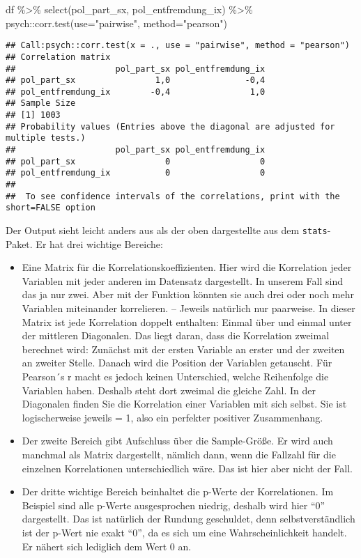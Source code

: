 \documentclass[
]{book}
\newenvironment{Shaded}{\begin{snugshade}}{\end{snugshade}}
\newcommand{\AttributeTok}[1]{\textcolor[rgb]{0.77,0.63,0.00}{#1}}
\newcommand{\FunctionTok}[1]{\textcolor[rgb]{0.00,0.00,0.00}{#1}}
\newcommand{\NormalTok}[1]{#1}
\newcommand{\SpecialCharTok}[1]{\textcolor[rgb]{0.00,0.00,0.00}{#1}}
\newcommand{\StringTok}[1]{\textcolor[rgb]{0.31,0.60,0.02}{#1}}
\begin{document}
\begin{Shaded}
\begin{Highlighting}[]
\NormalTok{df }\SpecialCharTok{\%\textgreater{}\%}
  \FunctionTok{select}\NormalTok{(pol\_part\_sx, pol\_entfremdung\_ix) }\SpecialCharTok{\%\textgreater{}\%} 
\NormalTok{  psych}\SpecialCharTok{::}\FunctionTok{corr.test}\NormalTok{(}\AttributeTok{use=}\StringTok{"pairwise"}\NormalTok{, }\AttributeTok{method=}\StringTok{"pearson"}\NormalTok{)}
\end{Highlighting}
\end{Shaded}

\begin{verbatim}
## Call:psych::corr.test(x = ., use = "pairwise", method = "pearson")
## Correlation matrix 
##                    pol_part_sx pol_entfremdung_ix
## pol_part_sx                1,0               -0,4
## pol_entfremdung_ix        -0,4                1,0
## Sample Size 
## [1] 1003
## Probability values (Entries above the diagonal are adjusted for multiple tests.) 
##                    pol_part_sx pol_entfremdung_ix
## pol_part_sx                  0                  0
## pol_entfremdung_ix           0                  0
## 
##  To see confidence intervals of the correlations, print with the short=FALSE option
\end{verbatim}

Der Output sieht leicht anders aus als der oben dargestellte aus dem \texttt{stats}-Paket. Er hat drei wichtige Bereiche:

\begin{itemize}
\item
  Eine Matrix für die Korrelationskoeffizienten. Hier wird die Korrelation jeder Variablen mit jeder anderen im Datensatz dargestellt. In unserem Fall sind das ja nur zwei. Aber mit der Funktion könnten sie auch drei oder noch mehr Variablen miteinander korrelieren. -- Jeweils natürlich nur paarweise. In dieser Matrix ist jede Korrelation doppelt enthalten: Einmal über und einmal unter der mittleren Diagonalen. Das liegt daran, dass die Korrelation zweimal berechnet wird: Zunächst mit der ersten Variable an erster und der zweiten an zweiter Stelle. Danach wird die Position der Variablen getauscht. Für Pearson´s r macht es jedoch keinen Unterschied, welche Reihenfolge die Variablen haben. Deshalb steht dort zweimal die gleiche Zahl. In der Diagonalen finden Sie die Korrelation einer Variablen mit sich selbst. Sie ist logischerweise jeweils = 1, also ein perfekter positiver Zusammenhang.
\item
  Der zweite Bereich gibt Aufschluss über die Sample-Größe. Er wird auch manchmal als Matrix dargestellt, nämlich dann, wenn die Fallzahl für die einzelnen Korrelationen unterschiedlich wäre. Das ist hier aber nicht der Fall.
\item
  Der dritte wichtige Bereich beinhaltet die p-Werte der Korrelationen. Im Beispiel sind alle p-Werte ausgesprochen niedrig, deshalb wird hier ``0'' dargestellt. Das ist natürlich der Rundung geschuldet, denn selbstverständlich ist der p-Wert nie exakt ``0'', da es sich um eine Wahrscheinlichkeit handelt. Er nähert sich lediglich dem Wert 0 an.
\end{itemize}
\end{document}

